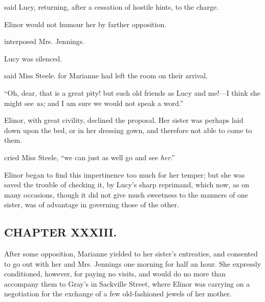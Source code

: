  said Lucy, returning, after a cessation of hostile hints, to the charge.



Elinor would not humour her by farther opposition.


 interposed Mrs. Jennings. 

Lucy was silenced.

 said Miss Steele.  for Marianne had left the room on their arrival.


“Oh, dear, that is a great pity! but such old friends as Lucy and me!---I think she might see {\em us;} and I am sure we would not speak a word.”

Elinor, with great civility, declined the proposal. Her sister was perhaps laid down upon the bed, or in her dressing gown, and therefore not able to come to them.

 cried Miss Steele, “we can just as well go and see {\em her}.”

Elinor began to find this impertinence too much for her temper; but she was saved the trouble of checking it, by Lucy's sharp reprimand, which now, as on many occasions, though it did not give much sweetness to the manners of one sister, was of advantage in governing those of the other.

\subsection[chapter-xxxiii.]{\useURL[url33][][][]\from[url33]CHAPTER XXXIII.}

After some opposition, Marianne yielded to her sister's entreaties, and consented to go out with her and Mrs. Jennings one morning for half an hour. She expressly conditioned, however, for paying no visits, and would do no more than accompany them to Gray's in Sackville Street, where Elinor was carrying on a negotiation for the exchange of a few old-fashioned jewels of her mother.

